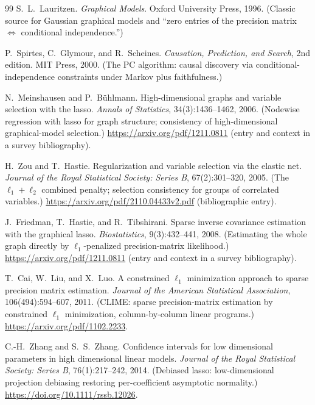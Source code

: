 \documentclass[11pt, a4paper]{article}
\theoremstyle{plain}
\theoremstyle{definition}
\theoremstyle{remark}
\begin{document}
\begin{thebibliography}{99}
S.~L.~Lauritzen.
\newblock \emph{Graphical Models}.
\newblock Oxford University Press, 1996. (Classic source for Gaussian graphical models and ``zero entries of the precision matrix $\Leftrightarrow$ conditional independence.'')

P.~Spirtes, C.~Glymour, and R.~Scheines.
\newblock \emph{Causation, Prediction, and Search}, 2nd edition.
\newblock MIT Press, 2000. (The PC algorithm: causal discovery via conditional-independence constraints under Markov plus faithfulness.)

N.~Meinshausen and P.~B\"uhlmann.
\newblock High-dimensional graphs and variable selection with the lasso.
\newblock \emph{Annals of Statistics}, 34(3):1436--1462, 2006. (Nodewise regression with lasso for graph structure; consistency of high-dimensional graphical-model selection.)
\newblock \url{https://arxiv.org/pdf/1211.0811} (entry and context in a survey bibliography).

H.~Zou and T.~Hastie.
\newblock Regularization and variable selection via the elastic net.
\newblock \emph{Journal of the Royal Statistical Society: Series B}, 67(2):301--320, 2005. (The $\ell_1 + \ell_2$ combined penalty; selection consistency for groups of correlated variables.)
\newblock \url{https://arxiv.org/pdf/2110.04433v2.pdf} (bibliographic entry).

J.~Friedman, T.~Hastie, and R.~Tibshirani.
\newblock Sparse inverse covariance estimation with the graphical lasso.
\newblock \emph{Biostatistics}, 9(3):432--441, 2008. (Estimating the whole graph directly by $\ell_1$-penalized precision-matrix likelihood.)
\newblock \url{https://arxiv.org/pdf/1211.0811} (entry and context in a survey bibliography).

T.~Cai, W.~Liu, and X.~Luo.
\newblock A constrained $\ell_1$ minimization approach to sparse precision matrix estimation.
\newblock \emph{Journal of the American Statistical Association}, 106(494):594--607, 2011. (CLIME: sparse precision-matrix estimation by constrained $\ell_1$ minimization, column-by-column linear programs.)
\newblock \url{https://arxiv.org/pdf/1102.2233}.

C.-H.~Zhang and S.~S.~Zhang.
\newblock Confidence intervals for low dimensional parameters in high dimensional linear models.
\newblock \emph{Journal of the Royal Statistical Society: Series B}, 76(1):217--242, 2014. (Debiased lasso: low-dimensional projection debiasing restoring per-coefficient asymptotic normality.)
\newblock \url{https://doi.org/10.1111/rssb.12026}.


\end{thebibliography}
\end{document}
